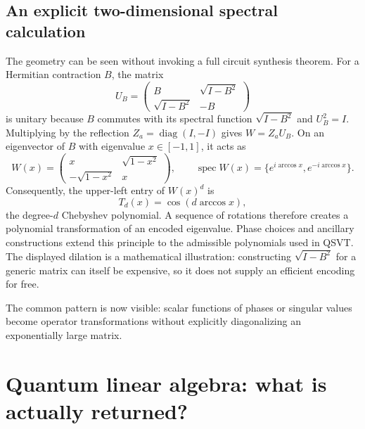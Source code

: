 \documentclass[11pt,a4paper]{article}
\newcommand{\diag}{\operatorname{diag}}
\theoremstyle{definition}
\theoremstyle{remark}
\numberwithin{equation}{section}
\begin{document}
\subsection{An explicit two-dimensional spectral calculation}
The geometry can be seen without invoking a full circuit synthesis theorem.
For a Hermitian contraction $B$, the matrix
\begin{equation}
 U_B=\begin{pmatrix}
 B&\sqrt{I-B^2}\\
 \sqrt{I-B^2}&-B
 \end{pmatrix}
\end{equation}
is unitary because $B$ commutes with its spectral function
$\sqrt{I-B^2}$ and $U_B^2=I$. Multiplying by the reflection
$Z_a=\diag(I,-I)$ gives $W=Z_aU_B$. On an eigenvector of $B$
with eigenvalue $x\in[-1,1]$, it acts as
\begin{equation}
 W(x)=\begin{pmatrix}
 x&\sqrt{1-x^2}\\
 -\sqrt{1-x^2}&x
 \end{pmatrix},
 \qquad \operatorname{spec}W(x)=
 \{e^{i\arccos x},e^{-i\arccos x}\}.
\end{equation}
Consequently, the upper-left entry of $W(x)^d$ is
\begin{equation}
 T_d(x)=\cos(d\arccos x),
\end{equation}
the degree-$d$ Chebyshev polynomial. A sequence of rotations therefore
creates a polynomial transformation of an encoded eigenvalue. Phase choices
and ancillary constructions extend this principle to the admissible
polynomials used in QSVT. The displayed dilation is a mathematical
illustration: constructing $\sqrt{I-B^2}$ for a generic matrix can itself be
expensive, so it does not supply an efficient encoding for free.

The common pattern is now visible: scalar functions of phases or singular
values become operator transformations without explicitly diagonalizing
an exponentially large matrix.

\section{Quantum linear algebra: what is actually returned?}\label{sec:linear}
\end{document}

